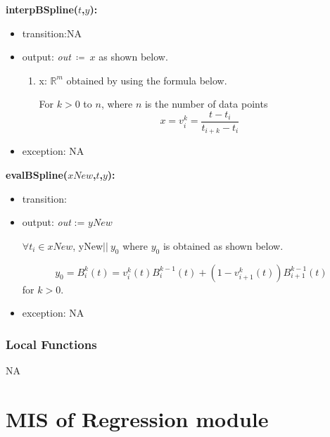 \documentclass[12pt, titlepage]{article}
\begin{document}
\noindent \textbf{interpBSpline($t$,$y$):}
\begin{itemize}
	\item transition:NA 
	
	\item output: \textit{out}$\ \coloneqq\ x$ as shown below.
	
		\begin{enumerate}
			
			\item x: $\mathbb{R}^{m}$ obtained by using the formula 
			below.
			
			For $k>0$ to $n$, where $n$ is the number of data points
			\begin{equation*}
			x = v_i ^k = \frac{t-t_i}{t_{i+k} - t_i}
			\end{equation*}
			
		\end{enumerate}
\item exception: NA 
\end{itemize}


\noindent \textbf{evalBSpline($xNew$,$t$,$y$):}
\begin{itemize}
	\item transition: 
	
	\item output:  \textit{out} := $yNew$
	
	$\forall t_i \in xNew$, yNew$\vert\vert\ y_0$ where $y_0$ is obtained as 
	shown below.
	
	\begin{equation*}
	y_0 = B_i ^k (t) = v_i ^k (t) B_i ^{k-1} (t) + (1 - v_{i+1} ^k (t))B_{i+1} 
	^{k-1} 
	(t)
	\end{equation*} 
	for $k>0$.\\
	\item exception: NA
\end{itemize}


\subsubsection{Local Functions}

NA


\section{MIS of Regression module} \label{mReg}
\end{document}
